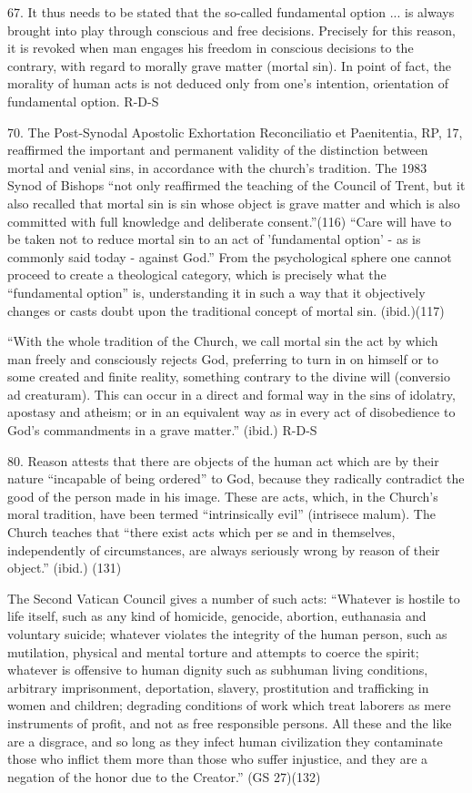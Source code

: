 \documentclass[oneside]{book}
\begin{document}
67. It thus needs to be stated that the so-called fundamental option ... is
always brought into play through conscious and free decisions. Precisely for
this reason, it is revoked when man engages his freedom in conscious decisions
to the contrary, with regard to morally grave matter (mortal sin). In point of
fact, the morality of human acts is not deduced only from one's intention,
orientation of fundamental option.
R-D-S

70. The Post-Synodal Apostolic Exhortation Reconciliatio et Paenitentia, RP, 17,
reaffirmed the important and permanent validity of the distinction between
mortal and venial sins, in accordance with the church's tradition. The 1983
Synod of Bishops ``not only reaffirmed the teaching of the Council of Trent, but
it also recalled that mortal sin is sin whose object is grave matter and which
is also committed with full knowledge and deliberate consent.''(116) ``Care will
have to be taken not to reduce mortal sin to an act of 'fundamental option' - as
is commonly said today - against God.'' From the psychological sphere one cannot
proceed to create a theological category, which is precisely what the
``fundamental option'' is, understanding it in such a way that it objectively
changes or casts doubt upon the traditional concept of mortal sin. (ibid.)(117)

``With the whole tradition of the Church, we call mortal sin the act by which
man freely and consciously rejects God, preferring to turn in on himself or to
some created and finite reality, something contrary to the divine will
(conversio ad creaturam). This can occur in a direct and formal way in the sins
of idolatry, apostasy and atheism; or in an equivalent way as in every act of
disobedience to God's commandments in a grave matter.'' (ibid.)
R-D-S

80. Reason attests that there are objects of the human act which are by their
nature ``incapable of being ordered'' to God, because they radically contradict
the good of the person made in his image. These are acts, which, in the Church's
moral tradition, have been termed ``intrinsically evil'' (intrisece malum). The
Church teaches that ``there exist acts which per se and in themselves,
independently of circumstances, are always seriously wrong by reason of their
object.'' (ibid.) (131)

The Second Vatican Council gives a number of such acts: ``Whatever is hostile to
life itself, such as any kind of homicide, genocide, abortion, euthanasia and
voluntary suicide; whatever violates the integrity of the human person, such as
mutilation, physical and mental torture and attempts to coerce the spirit;
whatever is offensive to human dignity such as subhuman living conditions,
arbitrary imprisonment, deportation, slavery, prostitution and trafficking in
women and children; degrading conditions of work which treat laborers as mere
instruments of profit, and not as free responsible persons. All these and the
like are a disgrace, and so long as they infect human civilization they
contaminate those who inflict them more than those who suffer injustice, and
they are a negation of the honor due to the Creator.'' (GS 27)(132)
\end{document}
